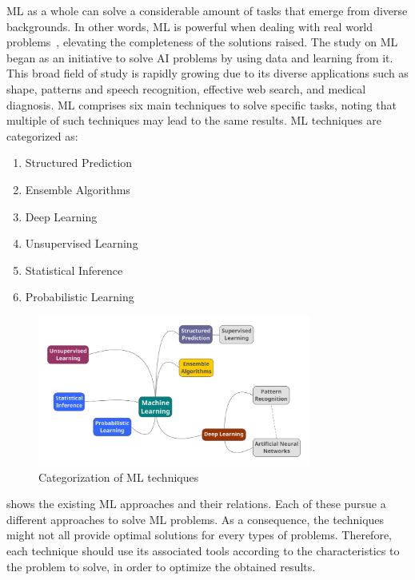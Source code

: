 \ac{ML} as a whole can solve a considerable amount of tasks that emerge from diverse backgrounds. 
In other words, \ac{ML} is powerful when dealing with real world problems~\cite{michalski13}, 
elevating the completeness of the solutions raised. 
The study on \ac{ML} began as an initiative to solve \ac{AI} problems by using data and learning from 
it. This broad field of study is rapidly growing due to its diverse applications such as shape, patterns 
and speech recognition, effective web search, and medical diagnosis. \ac{ML} comprises six main 
techniques to solve specific tasks, noting that multiple of such techniques may lead to the same 
results. \ac{ML} techniques are categorized as:
\begin{enumerate}
 \item Structured Prediction~\cite{taskar05}
 \item Ensemble Algorithms~\cite{dietterich00}
 \item Deep Learning~\cite{lecun15} 
 \item Unsupervised Learning~\cite{hastie09}
 \item Statistical Inference~\cite{robert14} 
 \item Probabilistic Learning~\cite{robert14}
\end{enumerate}

\begin{figure}[htbp]
  \centering
  \includegraphics[width=0.8\textwidth]{images/ai-categorization}
  \caption{Categorization of \acl{ML} techniques}
  \label{fig:ai-categorization}
\end{figure}

 shows the existing \ac{ML} approaches and their relations. Each of these 
pursue a different approaches to solve \ac{ML} problems. As a consequence, the techniques might 
not all provide optimal solutions for every types of problems. Therefore, each technique should use 
its associated tools according to the characteristics to the problem to solve, in order to optimize the 
obtained results.

